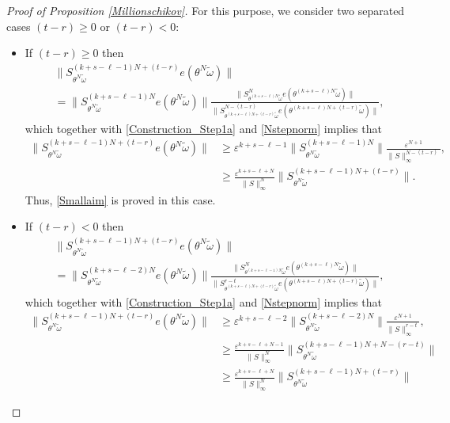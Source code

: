 \documentclass[10pt,a4paper]{amsart}
\newcommand{\eps}{\varepsilon}
\begin{document}
\begin{proof}[Proof of Proposition \ref{Millionschikov}]
For this purpose, we consider two separated cases $(t-r)\geq 0$ or $(t-r)<0$:
\begin{itemize}
    \item If $(t-r)\geq 0$ then
    \begin{align*}
       &\|S_{\theta^N\widetilde\omega}^{(k+s-\ell-1)N+(t-r)}e(\theta^N\widetilde\omega)\|\\[1ex]
       &= \|S_{\theta^N\widetilde\omega}^{(k+s-\ell-1)N}e(\theta^N\widetilde\omega)\|
       \frac{\|S^{N}_{\theta^{(k+s-\ell)N}\widetilde\omega}e(\theta^{(k+s-\ell)N}\widetilde\omega)\|}{\|S^{N-(t-r)}_{\theta^{(k+s-\ell)N+(t-r)}\widetilde\omega}e(\theta^{(k+s-\ell)N+(t-r)}\widetilde\omega)\|},
    \end{align*}
which together with \eqref{Construction_Step1a} and \eqref{Nstepnorm} implies that  \begin{align*}
       \|S_{\theta^N\widetilde\omega}^{(k+s-\ell-1)N+(t-r)}e(\theta^N\widetilde\omega)\|
       &\geq \eps^{k+s-\ell-1}\|S_{\theta^N\widetilde\omega}^{(k+s-\ell-1)N}\|\frac{\eps^{N+1}}{\|S\|_{\infty}^{N-(t-r)}},\\[1ex]
       &\geq 
       \frac{\eps^{k+s-\ell+N}}{\|S\|_{\infty}^N}       \|S_{\theta^N\widetilde\omega}^{(k+s-\ell-1)N+(t-r)}\|.
    \end{align*}
Thus, \eqref{Smallaim} is proved in this case.
\item If $(t-r)<0$ then 
 \begin{align*}
       &\|S_{\theta^N\widetilde\omega}^{(k+s-\ell-1)N+(t-r)}e(\theta^N\widetilde\omega)\|\\[1ex]
       &= \|S_{\theta^N\widetilde\omega}^{(k+s-\ell-2)N}e(\theta^N\widetilde\omega)\|
       \frac{\|S^{N}_{\theta^{(k+s-\ell-1)N}\widetilde\omega}e(\theta^{(k+s-\ell)N}\widetilde\omega)\|}{\|S^{r-t}_{\theta^{(k+s-\ell)N+(t-r)}\widetilde\omega}e(\theta^{(k+s-\ell)N+(t-r)}\widetilde\omega)\|},
    \end{align*}
which together with \eqref{Construction_Step1a} and \eqref{Nstepnorm} implies that  \begin{align*}
       \|S_{\theta^N\widetilde\omega}^{(k+s-\ell-1)N+(t-r)}e(\theta^N\widetilde\omega)\|
       &\geq \eps^{k+s-\ell-2}\|S_{\theta^N\widetilde\omega}^{(k+s-\ell-2)N}\|\frac{\eps^{N+1}}{\|S\|_{\infty}^{r-t}},\\[1ex]
       &\geq 
       \frac{\eps^{k+s-\ell+N-1}}{\|S\|_{\infty}^N}       \|S_{\theta^N\widetilde\omega}^{(k+s-\ell-1)N+N-(r-t)}\|\\
       &\geq \frac{\eps^{k+s-\ell+N}}{\|S\|_{\infty}^N}       \|S_{\theta^N\widetilde\omega}^{(k+s-\ell-1)N+(t-r)}\|

\end{align*}
\end{itemize}
\end{proof}
\end{document}
